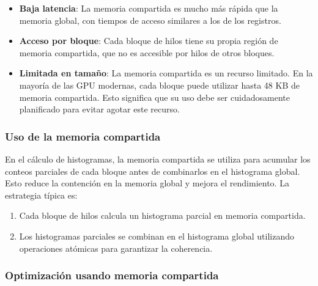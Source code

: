             \begin{itemize}
                
                \item \textbf{Baja latencia}: La memoria compartida es mucho más rápida que la memoria global, con tiempos de acceso similares a los de los registros.
                
                \item \textbf{Acceso por bloque}: Cada bloque de hilos tiene su propia región de memoria compartida, que no es accesible por hilos de otros bloques.
                
                \item \textbf{Limitada en tamaño}: La memoria compartida es un recurso limitado. En la mayoría de las GPU modernas, cada bloque puede utilizar hasta 48 KB de memoria compartida. Esto significa que su uso debe ser cuidadosamente planificado para evitar agotar este recurso.
          
            \end{itemize}
        
        \subsubsection{Uso de la memoria compartida}
        
            En el cálculo de histogramas, la memoria compartida se utiliza para acumular los conteos parciales de cada bloque antes de combinarlos en el histograma global. Esto reduce la contención en la memoria global y mejora el rendimiento. La estrategia típica es:
            
            \begin{enumerate}
            
                \item Cada bloque de hilos calcula un histograma parcial en memoria compartida.
                
                \item Los histogramas parciales se combinan en el histograma global utilizando operaciones atómicas para garantizar la coherencia.
                
            \end{enumerate}
        
        \subsubsection{Optimización usando memoria compartida}
        

